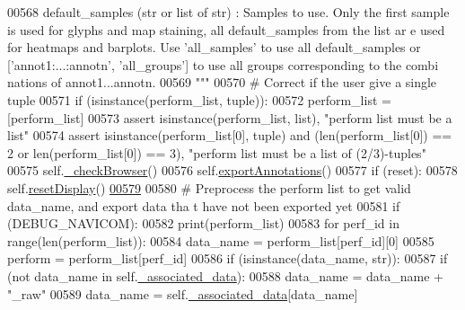 \begin{DoxyCode}
00568 \textcolor{stringliteral}{            default\_samples (str or list of str) : Samples to use. Only the first
       sample is used for glyphs and map staining, all default\_samples from the list ar
      e used for heatmaps and barplots. Use 'all\_samples' to use all default\_samples or
       ['annot1:...:annotn', 'all\_groups'] to use all groups corresponding to the combi
      nations of annot1...annotn.}
00569 \textcolor{stringliteral}{        """}
00570         \textcolor{comment}{# Correct if the user give a single tuple}
00571         \textcolor{keywordflow}{if} (isinstance(perform\_list, tuple)):
00572             perform\_list = [perform\_list]
00573         \textcolor{keyword}{assert} isinstance(perform\_list, list), \textcolor{stringliteral}{"perform list must be a list"}
00574         \textcolor{keyword}{assert} isinstance(perform\_list[0], tuple) \textcolor{keywordflow}{and} (len(perform\_list[0]) == 2 
      \textcolor{keywordflow}{or} len(perform\_list[0]) == 3), \textcolor{stringliteral}{"perform list must be a list of (2/3)-tuples"}
00575         self.\hyperlink{classnavicom_1_1navicom_1_1NaviCom_ab468a31a5f439bcae23f4c75b8c67f65}{_checkBrowser}()
00576         self.\hyperlink{classnavicom_1_1navicom_1_1NaviCom_a5a59edead26b5d02f17a60df055576f5}{exportAnnotations}()
00577         \textcolor{keywordflow}{if} (reset):
00578             self.\hyperlink{classnavicom_1_1navicom_1_1NaviCom_a379f15a87ba5c41c3501e9f386102c05}{resetDisplay}()
\hypertarget{navicom_8py_source_l00579}{}\hyperlink{classnavicom_1_1navicom_1_1NaviCom_ad7d4390d700d4a6d2533647887f8ab94}{00579} 
00580         \textcolor{comment}{# Preprocess the perform list to get valid data\_name, and export data tha
      t have not been exported yet}
00581         \textcolor{keywordflow}{if} (DEBUG\_NAVICOM):
00582             \textcolor{keywordflow}{print}(perform\_list)
00583         \textcolor{keywordflow}{for} perf\_id \textcolor{keywordflow}{in} range(len(perform\_list)):
00584             data\_name = perform\_list[perf\_id][0]
00585             perform = perform\_list[perf\_id]
00586             \textcolor{keywordflow}{if} (isinstance(data\_name, str)):
00587                 \textcolor{keywordflow}{if} (\textcolor{keywordflow}{not} data\_name \textcolor{keywordflow}{in} self.\hyperlink{classnavicom_1_1navicom_1_1NaviCom_a2e1d67aee497222ac3e508f6812d6a10}{_associated_data}):
00588                     data\_name = data\_name + \textcolor{stringliteral}{"\_raw"}
00589                 data\_name = self.\hyperlink{classnavicom_1_1navicom_1_1NaviCom_a2e1d67aee497222ac3e508f6812d6a10}{_associated_data}[data\_name]

\end{DoxyCode}
